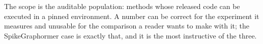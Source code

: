 The scope is the auditable population: methods whose released code can be executed in a pinned
environment. A number can be correct for the experiment it measures and unusable for the comparison a
reader wants to make with it; the SpikeGraphormer case is exactly that, and it is the most instructive
of the three.
